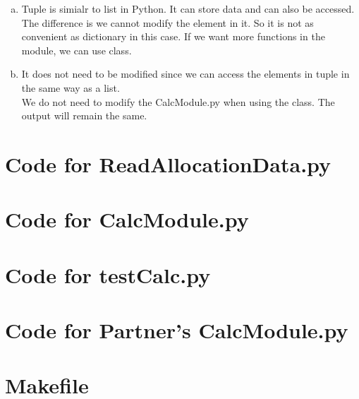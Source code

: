 \documentclass[12pt]{article}
\begin{document}
\begin{enumerate}[(a)]
\item Tuple is simialr to list in Python. It can store data and can also be accessed. The difference is we cannot modify the element in it. So it is not as convenient as dictionary in this case. If we want more functions in the module, we can use class.

\item It does not need to be modified since we can access the elements in tuple in the same way as a list.\\
We do not need to modify the CalcModule.py when using the class. The output will remain the same.

\end{enumerate}

\newpage

\lstset{language=Python, basicstyle=\tiny, breaklines=true, showspaces=false,
  showstringspaces=false, breakatwhitespace=true}

\def\thesection{\Alph{section}}

\section{Code for ReadAllocationData.py}

\noindent 

\newpage

\section{Code for CalcModule.py}

\noindent 

\newpage

\section{Code for testCalc.py}

\noindent 

\newpage

\section{Code for Partner's CalcModule.py}

\noindent 

\newpage

\section{Makefile}

\lstset{language=make}
\noindent 
\end{document}
